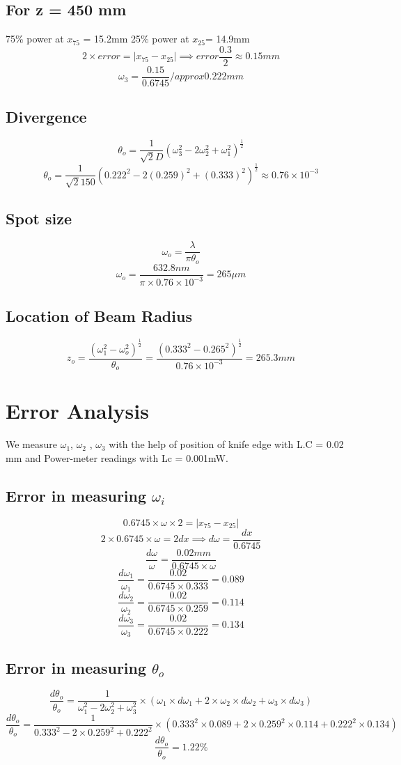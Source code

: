 \documentclass[
	letterpaper, %
	10pt, %
]{CSUniSchoolLabReport}
\begin{document}
\subsection{For z = 450 mm}
75\% power at $x_{75} $ = 15.2mm
25\% power at $x_{25} $= 14.9mm
\[
	2 \times error = \left\vert x_{75} - x_{25}\right\vert \implies error  \frac{0.3}{2}  \approx 0.15 mm
\]
\[
	\omega_3 = \frac{0.15}{0.6745} /approx 0.222 mm
\]
\subsection{Divergence}
\[
	\theta_o  = \frac{1}{\sqrt{2 } D}(\omega_3 ^2 - 2 \omega_2 ^2 + \omega_1 ^2 )^\frac{1}{2}
\]
\[
	\theta_o = \frac{1}{\sqrt{2 } 150}(0.222^2 - 2(0.259)^2 +(0.333)^2)^\frac{1}{2} \approx 0.76\times 10^{-3} 
\]
\subsection{Spot size}
\[
	\omega_o = \frac{\lambda}{\pi \theta_o}
\]
\[
	\omega_o = \frac{632.8 nm}{\pi\times  0.76\times 10^{-3} } = 265 \mu m
\]
\subsection{Location of Beam Radius}
\[
	z_o = \frac{(\omega_1^2 - \omega_o^2)^\frac{1}{2}}{\theta_o} = \frac{(0.333^2 - 0.265^2)^\frac{1}{2}}{0.76\times 10^{-3} } = 265.3 mm
\]
\section{Error Analysis}
We measure \(\omega_1\), \(\omega_2\) , \(\omega_3\) with the help of position of knife edge with L.C = 0.02 mm and Power-meter readings with Lc = 0.001mW. 
\subsection{Error in measuring \(\omega_i\) }
\[
	0.6745 \times \omega \times 2 = \left\vert x_{75} - x_{25}   \right\vert 
\]
\[
	2\times 0.6745\times \omega = 2 dx \implies d\omega = \frac{dx}{0.6745}
\]
\[
	\frac{d\omega}{\omega} = \frac{0.02 mm}{0.6745 \times \omega}
\]
\[
	\frac{d\omega_1}{\omega_1} = \frac{0.02}{0.6745 \times 0.333} = 0.089
\]
\[
	\frac{d\omega_2}{\omega_2} = \frac{0.02}{0.6745 \times 0.259} = 0.114
\]
\[
	\frac{d\omega_3}{\omega_3} = \frac{0.02}{0.6745 \times 0.222} = 0.134
\]
\subsection{Error in measuring \(\theta_o\) }
\[
	\frac{d\theta_o}{\theta_o} = \frac{1}{\omega_1^2 -2\omega_2^2 + \omega_3^2}\times \left(\omega_1\times d\omega_1+2\times \omega_2\times d\omega_2+\omega_3\times d\omega_3\right)
\]
\[
	\frac{d\theta_o}{\theta_o} = \frac{1}{0.333^2 - 2\times 0.259^2 + 0.222^2}\times \left(0.333^2\times 0.089+2\times0.259^2\times  0.114+0.222^2\times 0.134\right) 
\]
\[
	\frac{d\theta_o}{\theta_o} = 1.22\%
\]
\end{document}
